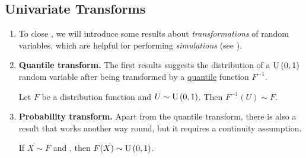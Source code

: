 \subsection{Univariate Transforms}
\label{subsect:univariate-trans}
\begin{enumerate}
\item To close , we will introduce some results about
\emph{transformations} of random variables, which are helpful for
performing \emph{simulations} (see ).
\item \textbf{Quantile transform.} The first results suggests the distribution
of a \(\operatorname{U}\left(0,1\right)\) random variable after being transformed by a
\underline{quantile} function \(F^{-1}\).

\begin{proposition}
\label{prp:quantile-trans}
Let \(F\) be a distribution function and \(U\sim\operatorname{U}\left(0,1\right)\). Then
\(F^{-1}(U)\sim F\).
\end{proposition}
\item \textbf{Probability transform.} Apart from the quantile transform, there
is also a result that works another way round, but it requires a continuity
assumption.

\begin{proposition}
\label{prp:prob-trans}
If \(X\sim F\) and , then \(F(X)\sim \operatorname{U}\left(0,1\right)\).
\end{proposition}
\end{enumerate}
